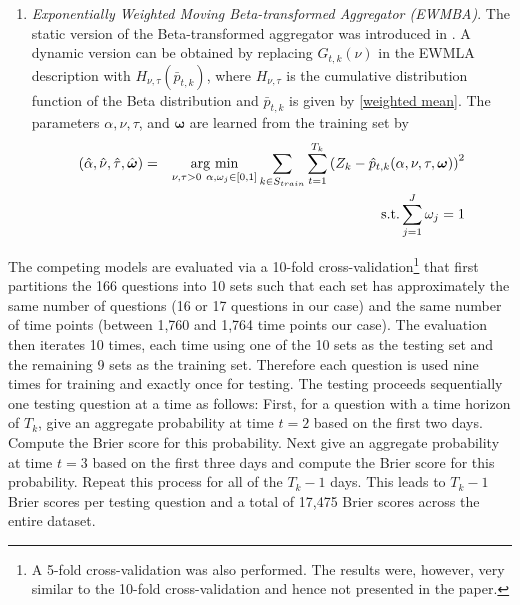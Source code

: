\documentclass[aoas, preprint]{imsart}
\newcommand{\argmin}{\operatornamewithlimits{arg\ min}}
\numberwithin{equation}{section}
\theoremstyle{plain}
\begin{document}
\begin{enumerate}
\begin{enumerate}
\item  \textit{Exponentially Weighted Moving Beta-transformed Aggregator (EWMBA)}. The static version of the Beta-transformed  aggregator was introduced in \cite{Ranjan08}. A dynamic version can be obtained by replacing $G_{t,k}(\nu )$ in the EWMLA description with $H_{\nu, \tau} \left( \bar{p}_{t,k}\right)$, where $H_{\nu, \tau}$ is the cumulative distribution function of the Beta distribution and $\bar{p}_{t,k}$ is given by \ref{weighted mean}. The parameters $\alpha, \nu, \tau$, and  $\boldsymbol{\omega}$ are learned from the training set by
\begin{eqnarray*}
(\hat{\alpha}, \hat{\nu}, \hat{\tau}, \hat{\boldsymbol{\omega}}) &=& \argmin_{\nu, \tau > 0\ \alpha, \omega_j \in [0,1]} \sum_{k \in S_{train}} \sum_{t=1}^{T_k} \left(Z_k - \hat{p}_{t,k}(\alpha, \nu, \tau, \boldsymbol{\omega})\right)^2\\
&& \text{s.t.} \sum_{j=1}^J \omega_j = 1
\end{eqnarray*} 
\end{enumerate}
\end{enumerate}



The competing models are evaluated via a 10-fold cross-validation\footnote{A 5-fold cross-validation was also performed. The results were, however, very similar to the 10-fold cross-validation and hence not presented in the paper.} that first partitions the 166 questions into 10 sets such that each set has approximately the same number of questions (16 or 17 questions in our case) and the same number of time points (between 1,760 and 1,764 time points our case). The evaluation then iterates 10 times, each time using one of the 10 sets as the testing set and the remaining 9 sets as the training set. Therefore each question is used nine times for training and exactly once for testing. The testing proceeds sequentially one testing question at a time as follows: First, for a question with a time horizon of $T_k$, give an aggregate probability at time $t=2$ based on the first two days. Compute the Brier score for this probability. Next give an aggregate probability at time $t=3$ based on the first three days and  compute the Brier score for this probability. Repeat this process for all of the $T_k-1$ days. This leads to $T_k-1$ Brier scores per testing question and a total of  17,475 Brier scores across the entire dataset. 
\end{document}
